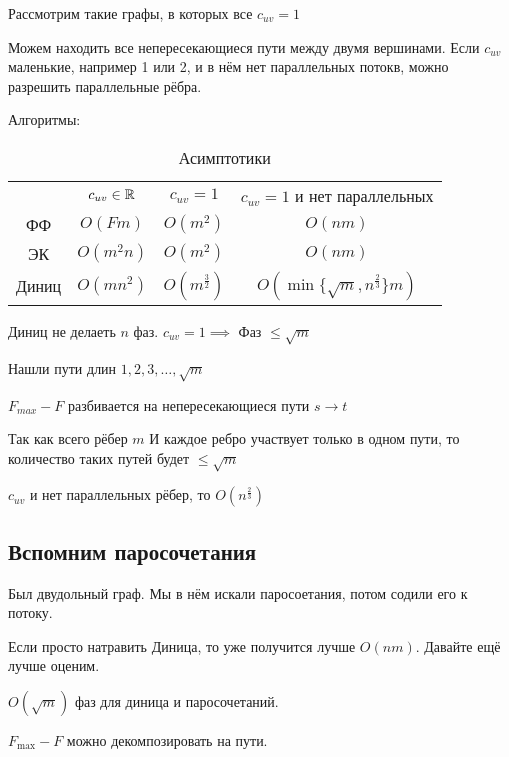 Рассмотрим такие графы, в которых все $c_{uv} = 1$

Можем находить все непересекающиеся пути между двумя вершинами. Если $c_{uv}$ маленькие, например 1 или 2, и в нём нет параллельных потокв, можно разрешить параллельные рёбра.

Алгоритмы:
\begin{table}[htpb]
    \centering
    \caption{Асимптотики}
    \label{tab:label}
    \begin{tabular}{cccc}
        & $c_{uv}\in \mathbb{R}$ & $c_{uv} = 1$ & $c_{uv}=1$ и нет параллельных\\
        ФФ & $O(Fm)$ & $O(m^2)$ & $O(nm)$\\
        ЭК & $O(m^2n)$ & $O(m^2)$ & $O(nm)$\\
        Диниц & $O(mn^2)$ & $O(m^{\frac{3}{2}})$ & $O(\min\{\sqrt{m}, n^{\frac{2}{3}} \}m)$
    \end{tabular}
\end{table}

\begin{statement}
    Диниц не делаеть $n$ фаз. $c_{uv}=1 \implies $ Фаз $\leqslant \sqrt{m}$

    Нашли пути длин $1, 2, 3, \ldots, \sqrt{m} $

    $F_{max} - F$ разбивается на непересекающиеся пути $s \to t$

    Так как всего рёбер $m$ И каждое ребро участвует только в одном пути, то количество таких путей будет $\leqslant \sqrt{m} $
\end{statement}

\begin{statement}
    $c_{uv}$ и нет параллельных рёбер, то $O(n^{\frac{2}{3}})$
\end{statement}

\subsection{Вспомним паросочетания}

Был двудольный граф. Мы в нём искали паросоетания, потом содили его к потоку.

Если просто натравить Диница, то уже получится лучше $O(nm)$. Давайте ещё лучше оценим.

\begin{statement}
    $O(\sqrt{m} )$ фаз для диница и паросочетаний.

    $F_{\max} - F$ можно декомпозировать на пути.
\end{statement}

